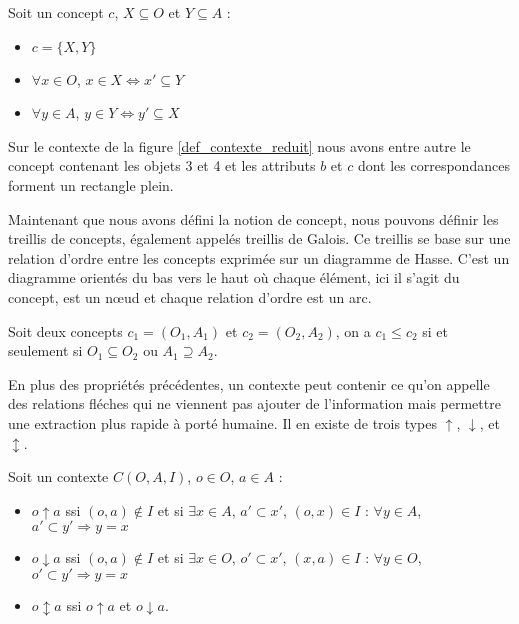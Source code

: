 \begin{definition}[Concept]
Soit un concept $c$, $X \subseteq O$ et $Y \subseteq A$ :
\begin{itemize}
	\item $c = \{X, Y\}$
	\item $\forall x \in O$, $x \in X \Leftrightarrow x' \subseteq Y$
	\item $\forall y \in A$, $y \in Y \Leftrightarrow y' \subseteq X$
\end{itemize}
\end{definition}

Sur le contexte de la figure \ref{def_contexte_reduit} nous avons entre autre le concept contenant les objets 3 et 4 et les attributs $b$ et $c$ dont les correspondances forment un rectangle plein.

\bigbreak

Maintenant que nous avons défini la notion de concept, nous pouvons définir les treillis de concepts, également appelés treillis de Galois. Ce treillis se base sur une relation d'ordre entre les concepts exprimée sur un diagramme de Hasse. C'est un diagramme orientés du bas vers le  haut où chaque élément, ici il s'agit du concept, est un n\oe ud et chaque relation d'ordre est un arc.

\begin{definition}
Soit deux concepts $c_1 = (O_1, A_1)$ et $c_2 = (O_2, A_2)$, on a $c_1 \leq c_2$ si et seulement si $O_1 \subseteq O_2$ ou $A_1 \supseteq A_2$.
\end{definition}

En plus des propriétés précédentes, un contexte peut contenir ce qu'on appelle des relations fléches qui ne viennent pas ajouter de l'information mais permettre une extraction plus rapide à porté humaine. Il en existe de trois types $\uparrow$, $\downarrow$, et $\updownarrow$.

\begin{definition}
Soit un contexte $C(O, A, I)$, $o \in O$, $a \in A$ :
\begin{itemize}
	\item $o \uparrow a$ ssi $(o, a) \not \in I$ et si $\exists x \in A$, $a' \subset x'$, $(o, x) \in I$ : $\forall y \in A$, $a' \subset y' \Rightarrow y = x$ 
	\item $o \downarrow a$ ssi $(o, a) \not \in I$ et si $\exists x \in O$, $o' \subset x'$, $(x, a) \in I$ : $\forall y \in O$, $o' \subset y' \Rightarrow y = x$ 
	\item $o \updownarrow a$ ssi $o \uparrow a$ et $o	 \downarrow a$.
\end{itemize}
\end{definition}

